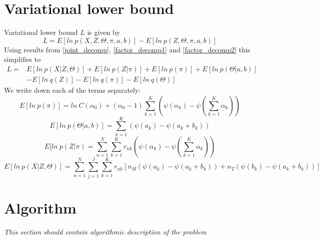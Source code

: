 \documentclass{article}
\newcommand\JointProb{p(X,Z,\Theta,\pi,a,b)}
\newcommand\Factorized{p(Z,\Theta,\pi,a,b)}
\newcommand\SumK{\sum_{k=1}^{K}}
\newcommand\SumN{\sum_{n=1}^{N}}
\newcommand\SumJ{\sum_{j=1}^{J}}
\begin{document}
\section{Variational lower bound}
Variational lower bound $L$ is given by 
\begin{equation}
    L = E[ln\:\JointProb{}] - E[ln\:\Factorized{}]
\end{equation}
Using results from \ref{joint_decomp}, \ref{factor_decomp1} and \ref{factor_decomp2}
this simplifies to
\begin{equation}
\begin{split}
    L =& E[ln\:p(X|Z,\Theta)] + E[ln\:p(Z|\pi)] + E[ln\:p(\pi)] + E[ln\:p(\Theta|a,b)] \\
    & -E[ln\:q(Z)] - E[ln\:q(\pi)] - E[ln\:q(\Theta)]
\end{split}        
\end{equation}
We write down each of the terms separately:
\begin{equation}
    E[ln\:p(\pi)] = ln\:C(\alpha_0)+(\alpha_0-1)\SumK (\psi(\alpha_k)-\psi(\SumK \alpha_k))
\end{equation}
\begin{equation}
    E[ln\:p(\Theta|a,b)]=\SumK (\psi(a_k)-\psi(a_k+b_k))
\end{equation}
\begin{equation}
    E[ln\:p(Z|\pi) = \SumN\SumK r_{nk}(\psi(\alpha_k)-\psi(\SumK \alpha_k))
\end{equation}
\begin{equation}
    E[ln\:p(X|Z,\Theta)] = \SumN\SumJ\SumK r_{nk}[n_H(\psi(a_k)-\psi(a_k+b_k))+n_T(\psi(b_k)-\psi(a_k+b_k))]
\end{equation}
\section{Algorithm}
\textit{This section should contain algorithmic description of the problem}
\end{document}
